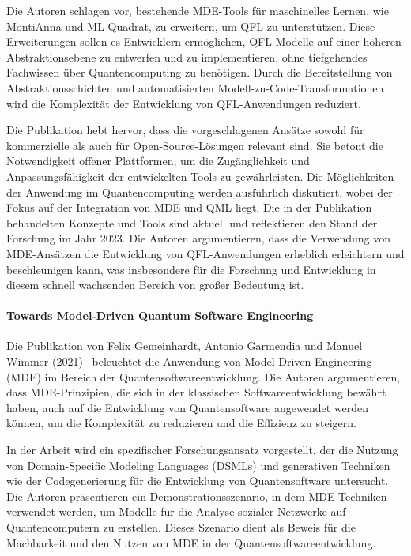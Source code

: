 Die Autoren schlagen vor, bestehende MDE-Tools für maschinelles Lernen, wie MontiAnna und ML-Quadrat, zu erweitern, um QFL 
zu unterstützen. Diese Erweiterungen sollen es Entwicklern ermöglichen, QFL-Modelle auf einer höheren 
Abstraktionsebene zu entwerfen und zu implementieren, ohne tiefgehendes Fachwissen über Quantencomputing zu benötigen. 
Durch die Bereitstellung von Abstraktionsschichten und automatisierten Modell-zu-Code-Transformationen wird die Komplexität 
der Entwicklung von QFL-Anwendungen reduziert.

Die Publikation hebt hervor, dass die vorgeschlagenen Ansätze sowohl für kommerzielle als auch für 
Open-Source-Lösungen relevant sind. Sie betont die Notwendigkeit offener Plattformen, um die Zugänglichkeit und 
Anpassungsfähigkeit der entwickelten Tools zu gewährleisten. Die Möglichkeiten der Anwendung im Quantencomputing werden 
ausführlich diskutiert, wobei der Fokus auf der Integration von MDE und QML liegt. Die in der Publikation 
behandelten Konzepte und Tools sind aktuell und reflektieren den Stand der Forschung im Jahr 2023. 
Die Autoren argumentieren, dass die Verwendung von MDE-Ansätzen die Entwicklung von QFL-Anwendungen 
erheblich erleichtern und beschleunigen kann, was insbesondere für die Forschung und 
Entwicklung in diesem schnell wachsenden Bereich von großer Bedeutung ist.

\paragraph{Towards Model-Driven Quantum Software Engineering}

Die Publikation von Felix Gemeinhardt, Antonio Garmendia und Manuel Wimmer (2021)~\cite{gemeinhardt2021towards} beleuchtet die Anwendung von 
Model-Driven Engineering (MDE) im Bereich der Quantensoftwareentwicklung. Die Autoren argumentieren, dass MDE-Prinzipien, 
die sich in der klassischen Softwareentwicklung bewährt haben, auch auf die Entwicklung von Quantensoftware angewendet 
werden können, um die Komplexität zu reduzieren und die Effizienz zu steigern.

In der Arbeit wird ein spezifischer Forschungsansatz vorgestellt, der die Nutzung von Domain-Specific Modeling Languages (DSMLs) und 
generativen Techniken wie der Codegenerierung für die Entwicklung von Quantensoftware untersucht. Die Autoren 
präsentieren ein Demonstrationsszenario, in dem MDE-Techniken verwendet werden, um Modelle für die Analyse 
sozialer Netzwerke auf Quantencomputern zu erstellen. Dieses Szenario dient als Beweis für die Machbarkeit 
und den Nutzen von MDE in der Quantensoftwareentwicklung.

